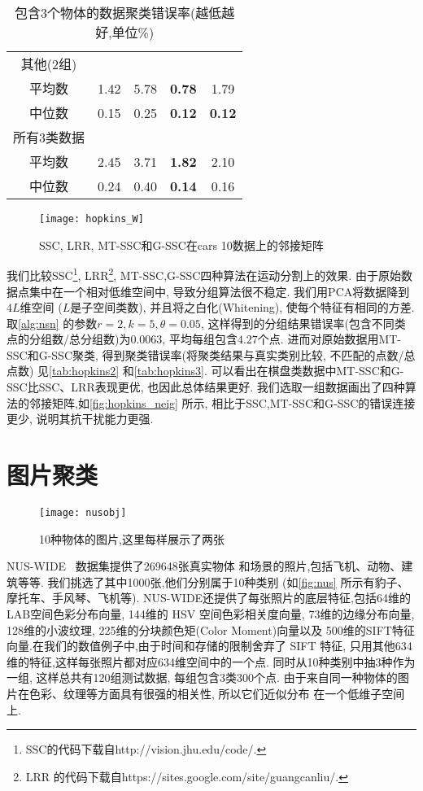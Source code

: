 \begin{table}[!htb]
\begin{tabular}{|c|c|c|c|c|}
	其他(2组)  &      &      &               &               \\
	平均数     & 1.42 & 5.78 & \textbf{0.78} & 1.79          \\
	中位数     & 0.15 & 0.25 & \textbf{0.12} & \textbf{0.12} \\ \hline
	所有3类数据  &      &      &               &               \\
	平均数     & 2.45 & 3.71 & \textbf{1.82} & 2.10 \\
    中位数     & 0.24 & 0.40 & \textbf{0.14}  & 0.16  \\ \hline
  \end{tabular}
  \caption{包含3个物体的数据聚类错误率(越低越好,单位\%)}
  \label{tab:hopkins3}
\end{table}

\begin{figure}[tb]
  \centering
  \texttt{[image: hopkins\_W]}
  \caption{SSC, LRR, MT-SSC和G-SSC在cars 10数据上的邻接矩阵}
  \label{fig:hopkins_neig}
\end{figure}
我们比较SSC\footnote{SSC的代码下载自http://vision.jhu.edu/code/.},
LRR\footnote{LRR 的代码下载自https://sites.google.com/site/guangcanliu/.},
MT-SSC,G-SSC四种算法在运动分割上的效果.
由于原始数据点集中在一个相对低维空间中, 导致分组算法很不稳定.
我们用PCA将数据降到\(4L\)维空间 (\(L\)是子空间类数), 并且将之白化(Whitening),
使每个特征有相同的方差. 
取\autoref{alg:nsn} 的参数\(r=2, k=5, \theta=0.05\),
这样得到的分组结果错误率(包含不同类点的分组数/总分组数)为\(0.0063\),
平均每组包含\(4.27\)个点.
进而对原始数据用MT-SSC和G-SSC聚类,
得到聚类错误率(将聚类结果与真实类别比较, 不匹配的点数/总点数)
见\autoref{tab:hopkins2} 和\autoref{tab:hopkins3}. 
可以看出在棋盘类数据中MT-SSC和G-SSC比SSC、LRR表现更优, 也因此总体结果更好.
我们选取一组数据画出了四种算法的邻接矩阵,如\autoref{fig:hopkins_neig} 所示,
相比于SSC,MT-SSC和G-SSC的错误连接更少, 说明其抗干扰能力更强.

\section{图片聚类}
\begin{figure}[htb]
  \centering
  \texttt{[image: nusobj]}
  \caption{10种物体的图片,这里每样展示了两张}
  \label{fig:nus}
\end{figure}
NUS-WIDE~\cite{chua2009NUS} 数据集提供了269648张真实物体
和场景的照片,包括飞机、动物、建筑等等.
我们挑选了其中1000张,他们分别属于10种类别
(如\autoref{fig:nus} 所示有豹子、摩托车、手风琴、飞机等).
NUS-WIDE还提供了每张照片的底层特征,包括64维的LAB空间色彩分布向量,
144维的 HSV 空间色彩相关度向量, 73维的边缘分布向量,
128维的小波纹理, 225维的分块颜色矩(Color Moment)向量以及
500维的SIFT特征向量.在我们的数值例子中,由于时间和存储的限制舍弃了
SIFT 特征, 只用其他634维的特征,这样每张照片都对应634维空间中的一个点.
同时从10种类别中抽3种作为一组, 这样总共有120组测试数据, 每组包含3类300个点.
由于来自同一种物体的图片在色彩、纹理等方面具有很强的相关性, 所以它们近似分布
在一个低维子空间上.

